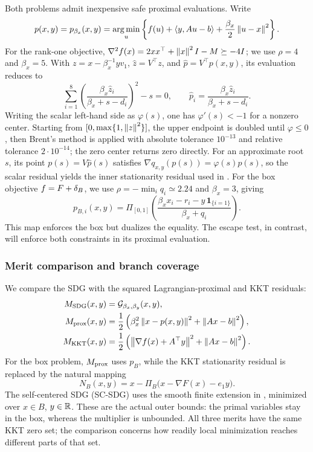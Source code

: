 Both problems admit inexpensive safe proximal evaluations.  Write
\begin{equation}
  p(x,y)=p_{\beta_x}(x,y)
  =\operatorname*{arg\,min}_u\left\{f(u)+\left\langle y,Au-b\right\rangle
                    +\frac{\beta_x}{2}\left\lVert u-x\right\rVert^2\right\}.
  \label{eq:experiment-lagrangian-prox}
\end{equation}
For the rank-one objective,
\(\nabla^2f(x)=2xx^\top+\left\lVert x\right\rVert^2I-M\succeq-4I\);
we use \(\rho=4\) and \(\beta_x=5\).  With
\(z=x-\beta_x^{-1}yv_1\), \(\widehat z=V^\top z\), and
\(\widehat p=V^\top p(x,y)\), its evaluation reduces to
\begin{equation}
  \sum_{i=1}^8
    \left(\frac{\beta_x\widehat z_i}{\beta_x+s-d_i}\right)^2-s=0,
  \qquad
  \widehat p_i=\frac{\beta_x\widehat z_i}{\beta_x+s-d_i}.
  \label{eq:experiment-secular-prox}
\end{equation}
Writing the scalar left-hand side as \(\varphi(s)\), one has
\(\varphi'(s)<-1\) for a nonzero center.  Starting from
\([0,\max\{1,\left\lVert z\right\rVert^2\}]\), the upper endpoint is doubled until
\(\varphi\le0\), then Brent's method is applied with absolute tolerance
\(10^{-13}\) and relative tolerance \(2\cdot10^{-14}\); the zero center
returns zero directly.  For an approximate root \(s\), its point
\(p(s)=V\widehat p(s)\) satisfies
\(\nabla q_{x,y}(p(s))=\varphi(s)p(s)\), so the scalar residual yields
the inner stationarity residual used in .
For the box objective \(f=F+\delta_B\), we use
\(\rho=-\min_i q_i\simeq2.24\) and \(\beta_x=3\), giving
\begin{equation}
  p_{B,i}(x,y)=\Pi_{[0,1]}
  \left(\frac{\beta_xx_i-r_i-y\,\mathbf1_{\{i=1\}}}{\beta_x+q_i}\right).
  \label{eq:box-branch-prox}
\end{equation}
This map enforces the box but dualizes the equality.  The escape test,
in contrast, will enforce both constraints in its proximal evaluation.

\subsubsection{Merit comparison and branch coverage}

We compare the SDG with the squared Lagrangian-proximal and KKT residuals:
\begin{align}
  M_{\rm SDG}(x,y)&=\mathcal{G}_{\beta_x,\beta_y}(x,y),\nonumber\\
  M_{\rm prox}(x,y)&=\frac12\left(
    \beta_x^2\left\lVert x-p(x,y)\right\rVert^2+\left\lVert Ax-b\right\rVert^2\right),\nonumber\\
  M_{\rm KKT}(x,y)&=\frac12\left(
    \left\lVert \nabla f(x)+A^\top y\right\rVert^2+\left\lVert Ax-b\right\rVert^2\right).
  \label{eq:experiment-merit-functions}
\end{align}
For the box problem, \(M_{\rm prox}\) uses \(p_B\), while the KKT
stationarity residual is replaced by the natural mapping
\[
  N_B(x,y)=x-\Pi_B\bigl(x-\nabla F(x)-e_1y\bigr).
\]
The self-centered SDG (SC-SDG) uses the smooth finite extension in
, minimized over
\(x\in B\), \(y\in\mathbb{R}\).  These are the actual outer bounds:
the primal variables stay in the box, whereas the multiplier is unbounded.
All three merits have the same KKT
zero set; the comparison concerns how readily local minimization reaches
different parts of that set.

